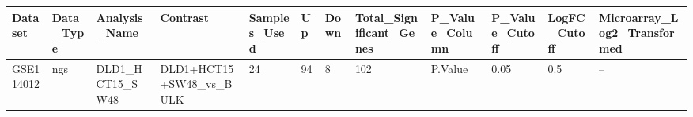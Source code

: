 \begingroup
\tiny
\setlength{\tabcolsep}{2pt}
\renewcommand{\arraystretch}{1.18}
\begin{tabular}{@{}llllllllllll@{}}
\toprule
Dataset & Data\_Type & Analysis\_Name & Contrast & Samples\_Used & Up & Down & Total\_Significant\_Genes & P\_Value\_Column & P\_Value\_Cutoff & LogFC\_Cutoff & Microarray\_Log2\_Transformed \\
\midrule
GSE114012 & ngs & DLD1\_HCT15\_SW48 & DLD1+HCT15+SW48\_vs\_BULK & 24 & 94 & 8 & 102 & P.Value & 0.05 & 0.5 & -- \\
\bottomrule
\end{tabular}
\endgroup
